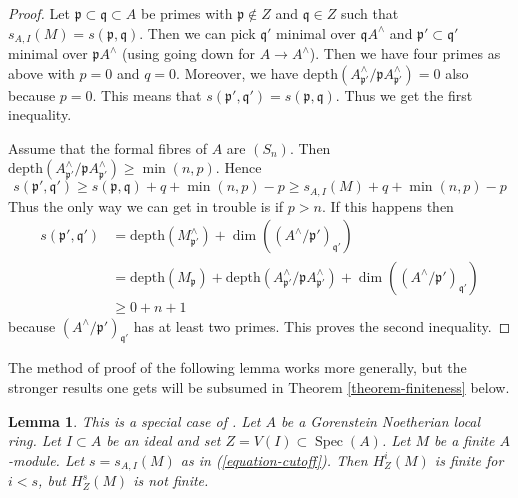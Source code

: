 \documentclass{stacks-project}
\newenvironment{reference}{\comment}{\endcomment}
\theoremstyle{plain}
\newtheorem{lemma}[subsection]{Lemma}
\theoremstyle{definition}
\theoremstyle{remark}
\numberwithin{equation}{subsection}
\def\Spec{\mathop{\mathrm{Spec}}}
\begin{document}
\begin{proof}
\medskip\noindent
Let $\mathfrak p \subset \mathfrak q \subset A$ be primes
with $\mathfrak p \not \in Z$ and $\mathfrak q \in Z$ such that
$s_{A, I}(M) = s(\mathfrak p, \mathfrak q)$.
Then we can pick $\mathfrak q'$ minimal over $\mathfrak q A^\wedge$
and $\mathfrak p' \subset \mathfrak q'$ minimal over
$\mathfrak p A^\wedge$ (using going down for $A \to A^\wedge$).
Then we have four primes as above with $p = 0$ and $q = 0$.
Moreover, we have
$\text{depth}(A^\wedge_{\mathfrak p'} / \mathfrak p A^\wedge_{\mathfrak p'})=0$
also because $p = 0$. This means that
$s(\mathfrak p', \mathfrak q') = s(\mathfrak p, \mathfrak q)$.
Thus we get the first inequality.

\medskip\noindent
Assume that the formal fibres of $A$ are $(S_n)$. Then
$\text{depth}(A^\wedge_{\mathfrak p'} / \mathfrak p A^\wedge_{\mathfrak p'})
\geq \min(n, p)$.
Hence
$$
s(\mathfrak p', \mathfrak q') \geq
s(\mathfrak p, \mathfrak q) + q + \min(n, p) - p \geq
s_{A, I}(M) + q + \min(n, p) - p
$$
Thus the only way we can get in trouble is if $p > n$. If this happens
then
\begin{align*}
s(\mathfrak p', \mathfrak q')
& =
\text{depth}(M^\wedge_{\mathfrak p'}) +
\dim((A^\wedge/\mathfrak p')_{\mathfrak q'}) \\
& =
\text{depth}(M_\mathfrak p) +
\text{depth}(A^\wedge_{\mathfrak p'} / \mathfrak p A^\wedge_{\mathfrak p'}) +
\dim((A^\wedge/\mathfrak p')_{\mathfrak q'}) \\
& \geq
0 + n + 1
\end{align*}
because $(A^\wedge/\mathfrak p')_{\mathfrak q'}$ has at least two primes.
This proves the second inequality.
\end{proof}

\noindent
The method of proof of the following lemma works more generally,
but the stronger results one gets will be subsumed in
Theorem \ref{theorem-finiteness} below.

\begin{lemma}
\label{lemma-local-annihilator}
\begin{reference}
This is a special case of
\cite[Satz 1]{Faltings-annulators}.
\end{reference}
Let $A$ be a Gorenstein Noetherian local ring. Let $I \subset A$
be an ideal and set $Z = V(I) \subset \Spec(A)$.
Let $M$ be a finite $A$-module. Let $s = s_{A, I}(M)$ as in
(\ref{equation-cutoff}). Then $H^i_Z(M)$ is finite for $i < s$,
but $H^s_Z(M)$ is not finite.
\end{lemma}
\end{document}
